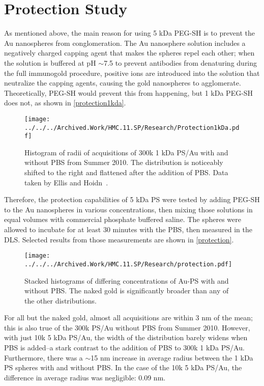 \section{Protection Study}
\label{protectionstudy}

As mentioned above, the main reason for using 5 kDa PEG-SH is to prevent the Au nanospheres from conglomeration. The Au nanosphere solution includes a negatively charged capping agent that makes the spheres repel each other; when the solution is buffered at pH \ensuremath{\sim}7.5 to prevent antibodies from denaturing during the full immunogold procedure, positive ions are introduced into the solution that neutralize the capping agents, causing the gold nanospheres to agglomerate. Theoretically, PEG-SH would prevent this from happening, but 1 kDa PEG-SH does not, as shown in \autoref{protection1kda}.

\begin{figure}[htbp]
\centering
\texttt{[image: ../../../Archived.Work/HMC.11.SP/Research/Protection1kDa.pdf]}
\caption{Histogram of radii of acquisitions of 300k 1 kDa PS\slash Au with and without PBS from Summer 2010. The distribution is noticeably shifted to the right and flattened after the addition of PBS. Data taken by Ellis and Hoidn~\citep{hoidnellis}.}
\label{protection1kda}
\end{figure}



Therefore, the protection capabilities of 5 kDa PS were tested by adding PEG-SH to the Au nanospheres in various concentrations, then mixing those solutions in equal volumes with commercial phosphate buffered saline. The spheres were allowed to incubate for at least 30 minutes with the PBS, then measured in the DLS. Selected results from those measurements are shown in \autoref{protection}.

\begin{figure}[htbp]
\centering
\texttt{[image: ../../../Archived.Work/HMC.11.SP/Research/protection.pdf]}
\caption{Stacked histograms of differing concentrations of Au-PS with and without PBS. The naked gold is significantly broader than any of the other distributions.}
\label{protection}
\end{figure}



For all but the naked gold, almost all acquisitions are within 3 nm of the mean; this is also true of the 300k PS\slash Au without PBS from Summer 2010. However, with just 10k 5 kDa PS\slash Au, the width of the distribution barely widens when PBS is added--a stark contrast to the addition of PBS to 300k 1 kDa PS\slash Au. Furthermore, there was a \ensuremath{\sim}15 nm increase in average radius between the 1 kDa PS spheres with and without PBS. In the case of the 10k 5 kDa PS\slash Au, the difference in average radius was negligible: 0.09 nm.

